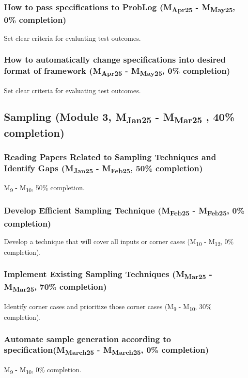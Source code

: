 \subsubsection{How to pass specifications to ProbLog (M\textsubscript{Apr25} - M\textsubscript{May25}, 0\% completion)}
Set clear criteria for evaluating test outcomes.

\subsubsection{How to automatically change specifications into desired format of framework (M\textsubscript{Apr25} - M\textsubscript{May25}, 0\% completion)}
Set clear criteria for evaluating test outcomes.



\subsection{Sampling (Module 3, M\textsubscript{Jan25} - M\textsubscript{Mar25} , 40\% completion)}
\subsubsection{Reading Papers Related to Sampling Techniques and Identify Gaps (M\textsubscript{Jan25} - M\textsubscript{Feb25}, 50\% completion)}
M\textsubscript{9} - M\textsubscript{10}, 50\% completion.

\subsubsection{Develop Efficient Sampling Technique (M\textsubscript{Feb25} - M\textsubscript{Feb25}, 0\% completion)}
Develop a technique that will cover all inputs or corner cases (M\textsubscript{10} - M\textsubscript{12}, 0\% completion).

\subsubsection{Implement Existing Sampling Techniques (M\textsubscript{Mar25} - M\textsubscript{Mar25}, 70\% completion)}
Identify corner cases and prioritize those corner cases (M\textsubscript{9} - M\textsubscript{10}, 30\% completion).

\subsubsection{Automate sample generation according to specification(M\textsubscript{March25} - M\textsubscript{March25}, 0\% completion)}
M\textsubscript{9} - M\textsubscript{10}, 0\% completion.




